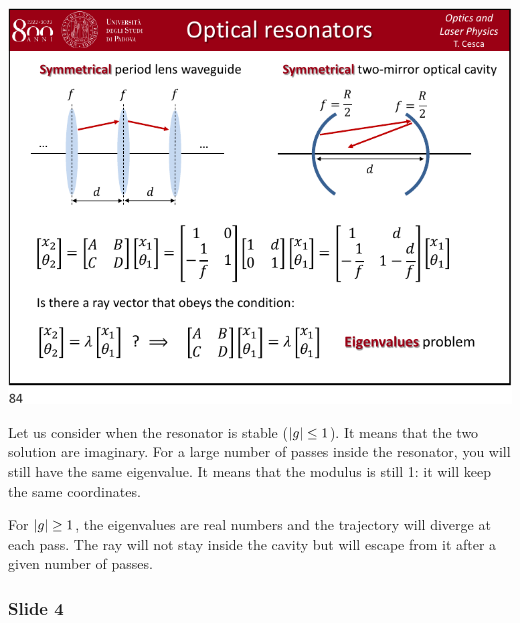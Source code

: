 \documentclass[../main/main.tex]{subfiles}
\begin{document}
\begin{minipage}[]{0.5\linewidth}
\centering
\includegraphics[page=3,width=1\textwidth]{../lessons/pdf_file/21_lecture.pdf}
\end{minipage}
\hspace{0.3cm}\vspace{0.3cm}
\begin{minipage}[c]{0.47\linewidth}

Let us consider when the resonator is stable (\( \abs{g} \le 1  \)). It means that the two solution are imaginary. For a large number of passes inside the resonator, you will still have the same eigenvalue. It means that the modulus is still 1: it will keep the same coordinates.

For \( \abs{g} \ge 1  \), the eigenvalues are real numbers and the trajectory will diverge at each pass. The ray will not stay inside the cavity but will escape from it after a given number of passes.

\end{minipage}

\newpage

\subsubsection*{Slide 4}
\end{document}
